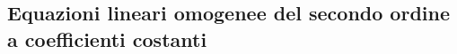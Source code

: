 \subsection{Equazioni lineari omogenee del secondo ordine a coefficienti costanti}
\label{sec:esercizi-equazioni-differenziali-equazioni-lineari-omogenee-secondo-ordine}
